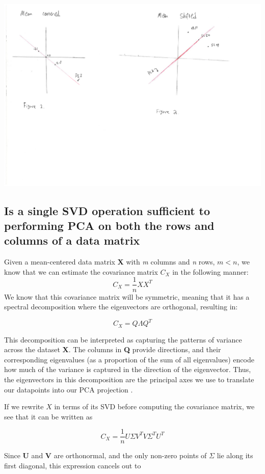 \documentclass[11pt,a4paper,landscape]{article}
\begin{document}
\includegraphics[width=\textwidth]{figure1_2.pdf}

\subsection{Is a single SVD operation sufficient to performing PCA on both the rows and columns of a data matrix}
\label{svd}

Given a mean-centered data matrix \textbf{X} with \textit{m} columns and \textit{n} rows, $m < n$, we know that we can estimate the covariance matrix \textbf{$C_{X}$} in the following manner:
$$ C_{X} = \frac{1}{n} XX^{T}$$
We know that this covariance matrix will be symmetric, meaning that it has a spectral decomposition where the eigenvectors are orthogonal, resulting in:

$$ C_{X} = Q \Lambda Q^{T} $$

This decomposition can be interpreted as capturing the patterns of variance across the dataset \textbf{X}. The columns in \textbf{Q} provide directions, and their corresponding eigenvalues (as a proportion of the sum of all eigenvalues) encode how much of the variance is captured in the direction of the eigenvector. Thus, the eigenvectors in this decomposition are the principal axes we use to translate our datapoints into our PCA projection \cite{pca_from_cxx} .\newline

If we rewrite $X$ in terms of its SVD before computing the covariance matrix, we see that it can be written as

$$ C_{X} = \frac{1}{n} U \Sigma V^{T} V\Sigma^{T} U^{T}  $$

Since \textbf{U} and \textbf{V} are orthonormal, and the only non-zero points of $ \Sigma $ lie along its first diagonal, this expression cancels out to                                                                                                                                                                          
\end{document}
